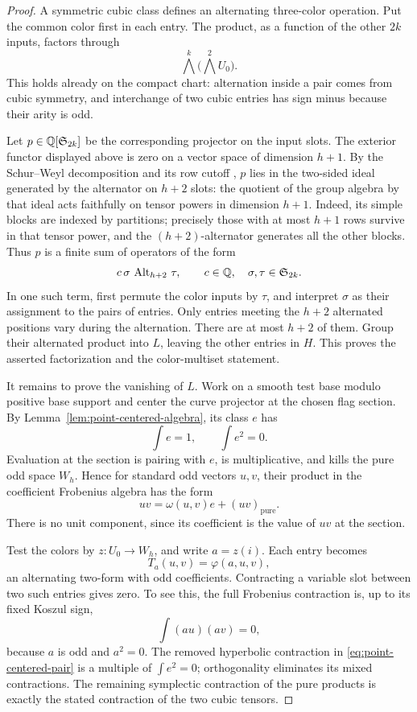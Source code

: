 \begin{proof}
A symmetric cubic class defines an alternating three-color operation.
Put the common color first in each entry.  The product, as a function of
the other \(2k\) inputs, factors through
\[
 \bigwedge^k\bigl(\bigwedge^2 U_0\bigr).
\]
This holds already on the compact chart: alternation inside a pair comes
from cubic symmetry, and interchange of two cubic entries has sign
minus because their arity is odd.

Let \(p\in\mathbb Q[\mathfrak S_{2k}]\) be the corresponding projector on the
input slots.  The exterior functor displayed above is zero on a vector
space of dimension \(h+1\).  By the Schur--Weyl decomposition and its row cutoff
\cite[Theorems~5.12.2, 5.18.4, and~5.22.1]{EtingofEtAl2011},
\(p\) lies in
the two-sided ideal generated by the alternator on \(h+2\) slots:
the quotient of the group algebra by that ideal acts faithfully on
tensor powers in dimension \(h+1\).  Indeed, its simple blocks are
indexed by partitions; precisely those with at most \(h+1\) rows
survive in that tensor power, and the \((h+2)\)-alternator generates
all the other blocks.  Thus \(p\) is a finite sum of
operators of the form
\[
 c\,\sigma\,\operatorname{Alt}_{h+2}\,\tau,
 \qquad c\in\mathbb Q,\quad \sigma,\tau\in\mathfrak S_{2k}.
\]
In one such term, first permute the color inputs by \(\tau\), and
interpret \(\sigma\) as their assignment to the pairs of entries.
Only entries meeting the \(h+2\) alternated positions vary during the
alternation.  There are at most \(h+2\) of them.  Group their alternated
product into \(L\), leaving the other entries in \(H\).
This proves the asserted factorization and the color-multiset statement.

It remains to prove the vanishing of \(L\).  Work on a smooth test base
modulo positive base support and center the curve projector at the chosen
flag section.  By Lemma~\ref{lem:point-centered-algebra}, its class \(e\)
has
\[
 \int e=1,\qquad \int e^2=0.
\]
Evaluation at the section is pairing with \(e\), is multiplicative, and
kills the pure odd space \(W_h\).  Hence for standard odd vectors \(u,v\),
their product in the coefficient Frobenius algebra has the form
\begin{equation}
\label{eq:point-centered-pair}
 uv=\omega(u,v)e+(uv)_{\mathrm{pure}}.
\end{equation}
There is no unit component, since its coefficient is the value of \(uv\)
at the section.

Test the colors by \(z:U_0\to W_h\), and write \(a=z(i)\).  Each entry
becomes
\[
 T_a(u,v)=\varphi(a,u,v),
\]
an alternating two-form with odd coefficients.  Contracting a variable
slot between two such entries gives zero.  To see this, the full
Frobenius contraction is, up to its fixed Koszul sign,
\[
 \int (au)(av)=0,
\]
because \(a\) is odd and \(a^2=0\).
The removed hyperbolic contraction in
\eqref{eq:point-centered-pair} is a multiple of \(\int e^2=0\);
orthogonality eliminates its mixed contractions.
The remaining symplectic contraction of the pure products is exactly
the stated contraction of the two cubic tensors.


\end{proof}
